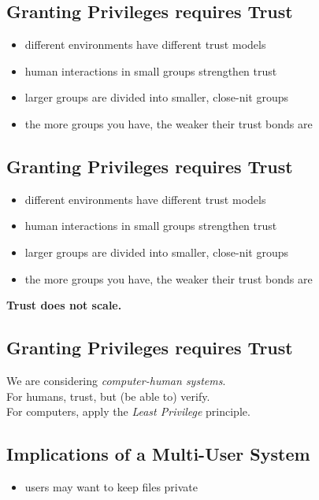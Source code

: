 \documentclass[xga]{xdvislides}
\begin{document}
\subsection{Granting Privileges requires Trust}
\begin{itemize}
	\item different environments have different trust models
	\item human interactions in small groups strengthen trust
	\item larger groups are divided into smaller, close-nit groups
	\item the more groups you have, the weaker their trust bonds are
\end{itemize}

\subsection{Granting Privileges requires Trust}
\begin{itemize}
	\item different environments have different trust models
	\item human interactions in small groups strengthen trust
	\item larger groups are divided into smaller, close-nit groups
	\item the more groups you have, the weaker their trust bonds are
\end{itemize}
\vspace{.5in}

\begin{center}
	\Huge
	{\bf Trust does not scale.}
	\Normalsize
\end{center}

\subsection{Granting Privileges requires Trust}
\Huge
We are considering {\em computer-human systems}. \\

\vspace{.5in}
For humans, trust, but (be able to) verify. \\

\vspace{.5in}
For computers, apply the {\em Least Privilege} principle. \\
\Normalsize

\subsection{Implications of a Multi-User System}
\begin{itemize}
	\item users may want to keep files private
\end{itemize}
\end{document}
